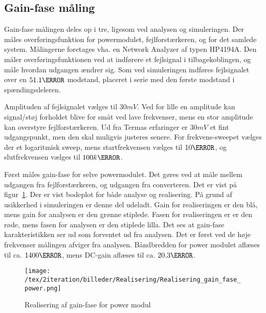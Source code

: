 \subsection{Gain-fase måling} \label{gain_fase_2}
Gain-fase målingen deles op i tre, ligesom ved analysen og simuleringen. Der måles overføringsfunktion for powermodulet, fejlforstærkeren, og for det samlede system. Målingerne foretages vha. en Network Analyzer af typen HP4194A. Den måler overføringsfunktionen ved at indførere et fejlsignal i tilbagekoblingen, og måle hvordan udgangen ændrer sig. Som ved simuleringen indføres fejlsignalet over en $51.1\ohm$ modstand, placeret i serie med den første modstand i spændingsdeleren. 

Amplituden af fejlsignalet vælges til $30mV$. Ved for lille en amplitude kan signal/støj forholdet blive for småt ved lave frekvenser, mens en stor amplitude kan overstyre fejlforstærkeren. Ud fra Termas erfaringer er $30mV$ et fint udgangspunkt, men den skal muligvis justeres senere. For frekvens-sweepet vælges der et logaritmisk sweep, mens startfrekvensen vælges til $10\hertz$, og slutfrekvensen vælges til $100k\hertz$. 

Først måles gain-fase for selve powermodulet. Det gøres ved at måle mellem udgangen fra fejlforstærkeren, og udgangen fra converteren. Det er vist på figur~\ref{fig:realisering_gain_fase_power}. Der er vist bodeplot for både analyse og realisering. På grund af usikkerhed i simuleringen er denne del udeladt. Gain for realiseringen er den blå, mens gain for analysen er den grønne stiplede. Fasen for realiseringen er er den røde, mens fasen for analysen er den stiplede lilla. Det ses at gain-fase karakteristikken ser ud som forventet ud fra analysen. Det er først ved de høje frekvenser målingen afviger fra analysen. Båndbredden for power modulet aflæses til ca. $1400\hertz$, mens DC-gain aflæses til ca. $20.3\decibel$.

\begin{figure}[H]
	\center
	\texttt{[image: /tex/2iteration/billeder/Realisering/Realisering\_gain\_fase\_power.png]}
	\caption{Realisering af gain-fase for power modul}
	\label{fig:realisering_gain_fase_power}
\end{figure}



